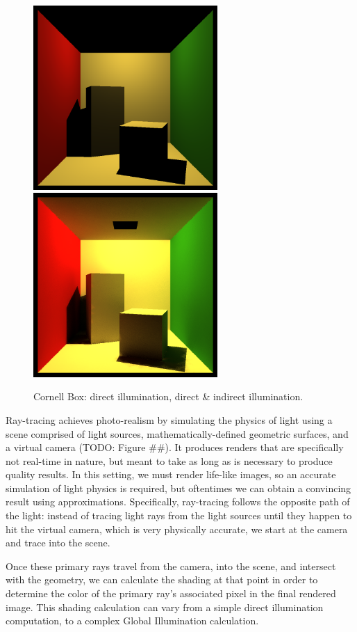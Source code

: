 \begin{figure}[h!]
    \centering
    \includegraphics[width=70mm]{../img/cornell_simp_direct_only.png}
    \includegraphics[width=70mm]{../img/cornell_simp_indirect.png}
    \caption{Cornell Box: direct illumination, direct \& indirect illumination.}
    \label{fig:compare_illumination}
\end{figure}

Ray-tracing achieves photo-realism by simulating the physics of light using a scene comprised of light sources, mathematically-defined geometric surfaces, and a virtual camera (TODO: Figure \#\#). It produces renders that are specifically not real-time in nature, but meant to take as long as is necessary to produce quality results. In this setting, we must render life-like images, so an accurate simulation of light physics is required, but oftentimes we can obtain a convincing result using approximations. Specifically, ray-tracing follows the opposite path of the light: instead of tracing light rays from the light sources until they happen to hit the virtual camera, which is very physically accurate, we start at the camera and trace into the scene.

Once these primary rays travel from the camera, into the scene, and intersect with the geometry, we can calculate the shading at that point in order to determine the color of the primary ray's associated pixel in the final rendered image. This shading calculation can vary from a simple direct illumination computation, to a complex Global Illumination calculation.

